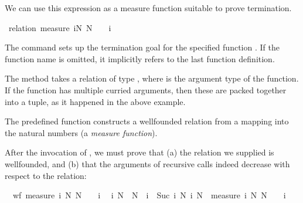 \begin{isabellebody}
\begin{isamarkuptext}
  We can use this expression as a measure function suitable to prove termination.%
\end{isamarkuptext}%
\isamarkuptrue%
\isamarkupfalse%
\isanewline
%
\isadelimproof
%
\endisadelimproof
%
\isatagproof
{}\isamarkupfalse%
\ {\isacharparenleft}relation\ {\isachardoublequoteopen}measure\ {\isacharparenleft}{\isasymlambda}{\isacharparenleft}i{\isacharcomma}N{\isacharparenright}{\isachardot}\ N\ {\isacharplus}\ {}\ {\isacharminus}\ i{\isacharparenright}{\isachardoublequoteclose}{\isacharparenright}%
\begin{isamarkuptxt}%
The  command sets up the termination goal for the
  specified function . If the function name is omitted, it
  implicitly refers to the last function definition.

  The  method takes a relation of
  type , where  is the argument type of
  the function. If the function has multiple curried arguments, then
  these are packed together into a tuple, as it happened in the above
  example.

  The predefined function  constructs a
  wellfounded relation from a mapping into the natural numbers (a
  \emph{measure function}). 

  After the invocation of , we must prove that (a)
  the relation we supplied is wellfounded, and (b) that the arguments
  of recursive calls indeed decrease with respect to the
  relation:

  \begin{isabelle}%
\ {}{\isachardot}\ wf\ {\isacharparenleft}measure\ {\isacharparenleft}{\isasymlambda}{\isacharparenleft}i{\isacharcomma}\ N{\isacharparenright}{\isachardot}\ N\ {\isacharplus}\ {}\ {\isacharminus}\ i{\isacharparenright}{\isacharparenright}\isanewline
\ {}{\isachardot}\ {\isasymAnd}i\ N{\isachardot}\ {\isasymnot}\ N\ {\isacharless}\ i\ {\isasymLongrightarrow}\ {\isacharparenleft}{\isacharparenleft}Suc\ i{\isacharcomma}\ N{\isacharparenright}{\isacharcomma}\ i{\isacharcomma}\ N{\isacharparenright}\ {\isasymin}\ measure\ {\isacharparenleft}{\isasymlambda}{\isacharparenleft}i{\isacharcomma}\ N{\isacharparenright}{\isachardot}\ N\ {\isacharplus}\ {}\ {\isacharminus}\ i{\isacharparenright}%
\end{isabelle}


\end{isamarkuptxt}
\end{isabellebody}
